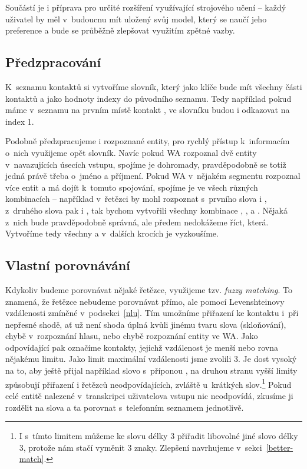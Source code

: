 Součástí je i příprava pro určité rozšíření využívající strojového učení -- každý
uživatel by měl v~budoucnu mít uložený svůj model, který se naučí jeho preference a bude se
průběžně zlepšovat využitím zpětné vazby.

\subsection{Předzpracování}\label{preprocess}

K~seznamu kontaktů si vytvoříme slovník,
který jako klíče bude mít všechny části kontaktů a jako hodnoty indexy do původního
seznamu. Tedy například pokud máme v~seznamu na prvním místě kontakt ,
ve slovníku budou  i  odkazovat na index 1.

Podobně předzpracujeme i rozpoznané entity, pro rychlý přístup k~informacím o~nich
využijeme opět slovník. Navíc pokud WA rozpoznal dvě entity v~navazujících úsecích vstupu,
spojíme je dohromady, pravděpodobně se totiž jedná právě třeba o~jméno a příjmení.
Pokud WA v~nějakém segmentu rozpoznal více entit a má dojít k~tomuto spojování, spojíme
je ve všech různých kombinacích -- například v~řetězci  by mohl
rozpoznat s~prvního slova  i , z~druhého slova pak  i
, tak bychom vytvořili všechny kombinace , ,
 a . Nějaká z~nich bude pravděpodobně správná, ale
předem nedokážeme říct, která. Vytvoříme tedy všechny a v~dalších krocích
je vyzkoušíme.

\subsection{Vlastní porovnávání}\label{subsection-matching}

Kdykoliv budeme porovnávat nějaké řetězce, využijeme tzv. \textit{fuzzy matching}.
To znamená, že řetězce nebudeme porovnávat přímo, ale pomocí Levenshteinovy vzdálenosti
zmíněné v~podsekci~\ref{nlu}. Tím umožníme přiřazení ke kontaktu i~při nepřesné shodě,
ať už není shoda úplná kvůli jinému tvaru slova (skloňování), chybě v~rozpoznání
hlasu, nebo chybě rozpoznání entity ve WA. Jako odpovídající pak označíme kontakty,
jejichž vzdálenost je menší nebo rovna nějakému limitu. Jako limit maximální vzdálenosti
jsme zvolili 3. Je dost vysoký na to, aby ještě přijal například slovo s~příponou
, na druhou stranu vyšší limity způsobují přiřazení i řetězců neodpovídajících,
zvláště u~krátkých slov.\footnote{I s~tímto limitem můžeme ke slovu délky 3 přiřadit libovolné jiné
    slovo délky 3, protože nám stačí vyměnit 3 znaky. Zlepšení navrhujeme v~sekci~\ref{better-match}.}
Pokud celé entitě nalezené v~transkripci uživatelova vstupu nic neodpovídá,
zkusíme ji rozdělit na slova a ta porovnat s~telefonním seznamem jednotlivě.

